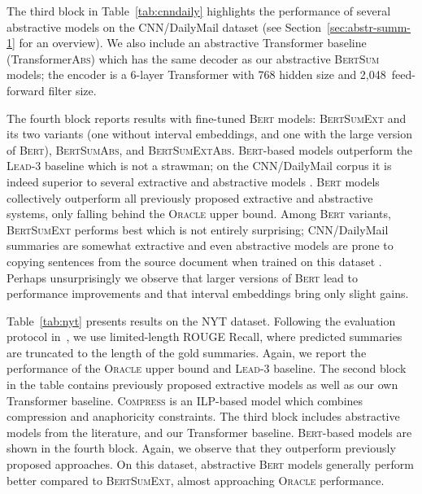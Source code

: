 \documentclass[11pt,a4paper]{article}
\begin{document}
    The third block in Table~\ref{tab:cnndaily} highlights the performance
    of several abstractive models on the CNN/DailyMail dataset (see
    Section~\ref{sec:abstr-summ-1} for an overview). We also include an
    abstractive Transformer baseline (Transformer\textsc{Abs}) which has
    the same decoder as our abstractive \textsc{BertSum} models; the encoder
    is a 6-layer Transformer with 768 hidden size and 2,048~feed-forward
    filter size.
    
    
    The fourth block reports results with fine-tuned \textsc{Bert} models:
    \textsc{BertSumExt} and its two variants  (one without interval
    embeddings, and one with the large version of \textsc{Bert}),
    \textsc{BertSumAbs}, and \textsc{BertSumExtAbs}.  \textsc{Bert}-based
    models outperform the \textsc{Lead}-3 baseline which is not a
    strawman; on the CNN/DailyMail corpus it is indeed superior to
    several extractive
    \cite{nallapati2017summarunner,narayan2018ranking,zhou2018neural} and
    abstractive models \cite{see-acl17}. \textsc{Bert} models collectively
    outperform all previously proposed extractive and abstractive systems,
    only falling behind the \textsc{Oracle} upper bound. Among
    \textsc{Bert} variants, \textsc{BertSumExt} performs best which is not
    entirely surprising; CNN/DailyMail summaries are somewhat extractive
    and even abstractive models are prone to copying sentences from the
    source document when trained on this dataset \cite{see-acl17}. Perhaps
    unsurprisingly we observe that larger versions of \textsc{Bert} lead
    to performance improvements and that interval embeddings bring only
    slight gains.
    
    
    Table~\ref{tab:nyt} presents results on the NYT dataset.  Following
    the evaluation protocol in~\citet{durrett2016learning}, we use
    limited-length ROUGE Recall, where predicted summaries are truncated
    to the length of the gold summaries.  Again, we report the performance
    of the \textsc{Oracle} upper bound and \textsc{Lead}-3 baseline. The
    second block in the table contains previously proposed extractive
    models as well as our own Transformer baseline. \textsc{Compress}
    \cite{durrett2016learning} is an ILP-based model which combines
    compression and anaphoricity constraints. The third block includes
    abstractive models from the literature, and our Transformer baseline.
    \textsc{Bert}-based models are shown in the fourth block. Again, we
    observe that they outperform previously proposed  approaches. On this dataset, abstractive \textsc{Bert}
    models generally perform better compared to \textsc{BertSumExt},
    almost approaching \textsc{Oracle} performance.
    
\end{document}
